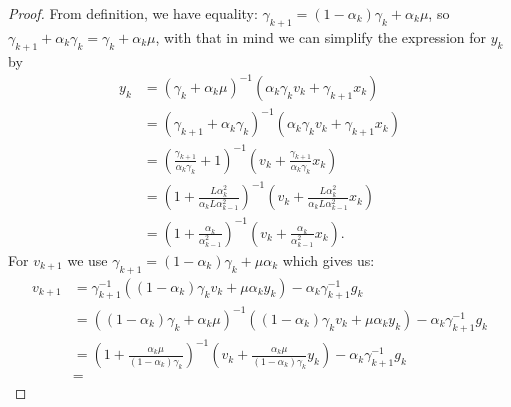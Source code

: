 \documentclass[12pt]{article}
\begin{document}
    \begin{proof}
        From definition,  we have equality: $\gamma_{k + 1} = (1 - \alpha_k)\gamma_k + \alpha_k \mu$, so $\gamma_{k + 1} + \alpha_k \gamma_k = \gamma_k + \alpha_k \mu$, with that in mind we can simplify the expression for $y_k$ by 
        \begin{align*}
            y_{k} &= 
            (\gamma_k + \alpha_k \mu)^{-1}
            (\alpha_k \gamma_k v_k + \gamma_{k + 1}x_k)
            \\
            &= 
            (\gamma_{k + 1} + \alpha_k \gamma_k)^{-1}
            (\alpha_k \gamma_k v_k + \gamma_{k + 1}x_k)
            \\
            &= 
            \left(
                \frac{\gamma_{k + 1}}{\alpha_k\gamma_k} + 1
            \right)^{-1}
            \left(
                v_k + \frac{\gamma_{k + 1}}{\alpha_k \gamma_k} x_k
            \right)
            \\
            &= 
            \left(
                1 + \frac{L\alpha_k^2}{\alpha_kL\alpha_{k - 1}^2} 
            \right)^{-1}
            \left(
                v_k + \frac{L\alpha_k^2}{\alpha_k L\alpha_{k - 1}^2} x_k
            \right)
            \\
            &= 
            \left(
                1 + \frac{\alpha_k}{\alpha_{k - 1}^2}
            \right)^{-1}
            \left(
                v_k + 
                \frac{\alpha_k}{\alpha_{k - 1}^2} x_k
            \right). 
        \end{align*}
        For $v_{k + 1}$ we use $\gamma_{k + 1} = (1 - \alpha_k)\gamma_k + \mu \alpha_k$ which gives us: 
        \begin{align*}
            v_{k + 1} &= 
            \gamma_{k + 1}^{-1}
            ((1 - \alpha_k)\gamma_k v_k + \mu\alpha_k y_k)
            - \alpha_k\gamma_{k + 1}^{-1}g_k
            \\
            &= 
            ((1 - \alpha_k)\gamma_k + \alpha_k \mu)^{-1}
            \left(
                (1 - \alpha_k)\gamma_k v_k + \mu\alpha_k y_k
            \right)
            - \alpha_k\gamma_{k + 1}^{-1} g_k
            \\
            &= 
            \left(
                1 + \frac{\alpha_k\mu}{(1 - \alpha_k)\gamma_k}
            \right)^{-1}
            \left(
                v_k + 
                \frac{\alpha_k\mu}{(1 - \alpha_k)\gamma_k} y_k
            \right)
            - \alpha_k\gamma_{k + 1}^{-1} g_k
            \\
            &= 

\end{align*}
\end{proof}
\end{document}

